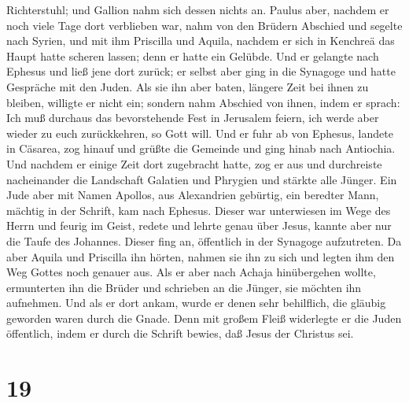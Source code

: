 Richterstuhl; und Gallion nahm sich dessen nichts an. 
Paulus aber, nachdem er noch viele Tage dort verblieben war, nahm von
den Brüdern Abschied und segelte nach Syrien, und mit ihm Priscilla und
Aquila, nachdem er sich in Kenchreä das Haupt hatte scheren lassen; denn
er hatte ein Gelübde.  Und er gelangte nach Ephesus und
ließ jene dort zurück; er selbst aber ging in die Synagoge und hatte
Gespräche mit den Juden.  Als sie ihn aber baten, längere
Zeit bei ihnen zu bleiben, willigte er nicht ein; 
sondern nahm Abschied von ihnen, indem er sprach: Ich muß durchaus das
bevorstehende Fest in Jerusalem feiern, ich werde aber wieder zu euch
zurückkehren, so Gott will. Und er fuhr ab von Ephesus, 
landete in Cäsarea, zog hinauf und grüßte die Gemeinde und ging hinab
nach Antiochia.  Und nachdem er einige Zeit dort
zugebracht hatte, zog er aus und durchreiste nacheinander die Landschaft
Galatien und Phrygien und stärkte alle Jünger.  Ein Jude
aber mit Namen Apollos, aus Alexandrien gebürtig, ein beredter Mann,
mächtig in der Schrift, kam nach Ephesus.  Dieser war
unterwiesen im Wege des Herrn und feurig im Geist, redete und lehrte
genau über Jesus, kannte aber nur die Taufe des Johannes.
 Dieser fing an, öffentlich in der Synagoge aufzutreten.
Da aber Aquila und Priscilla ihn hörten, nahmen sie ihn zu sich und
legten ihm den Weg Gottes noch genauer aus.  Als er aber
nach Achaja hinübergehen wollte, ermunterten ihn die Brüder und
schrieben an die Jünger, sie möchten ihn aufnehmen. Und als er dort
ankam, wurde er denen sehr behilflich, die gläubig geworden waren durch
die Gnade.  Denn mit großem Fleiß widerlegte er die Juden
öffentlich, indem er durch die Schrift bewies, daß Jesus der Christus
sei.

\hypertarget{section-18}{%
\section{19}\label{section-18}}

